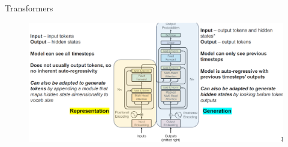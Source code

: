 \begin{frame}{Transformers}
    \begin{figure}
        \centering
        \includegraphics[width=\linewidth, height=0.9\textheight,keepaspectratio]{images/nlp/transformers-architecture-2.png}
    \end{figure}
\end{frame}